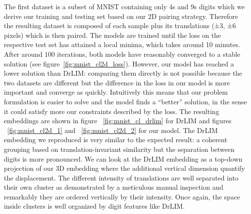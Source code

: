 \documentclass[a4paper,12pt]{report}
\begin{document}
The first dataset is a subset of MNIST containing only 4s and 9s digits which we derive our training and testing set based on our 2D pairing strategy.
Therefore the resulting dataset is composed of each sample plus its translations (±3, ±6 pixels) which is then paired.
The models are trained until the loss on the respective test set has attained a local minima, which takes around 10 minutes.
After around $100$ iterations, both models have reasonably converged to a stable solution (see figure~\ref{fig:mnist_cl2d_loss}).
However, our model has reached a lower solution than DrLIM: comparing them directly is not possible because the two datasets are different but the difference in the loss in our model is more important and converge as quickly.
Intuitively this means that our problem formulation is easier to solve and the model finds a ``better'' solution, in the sense it could satisfy more our constraints described by the loss.
The resulting embeddings are shown in figure ~\ref{fig:mnist_cl_drlim} for DrLIM and figures ~\ref{fig:mnist_cl2d_1} and ~\ref{fig:mnist_cl2d_2} for our model.
The DrLIM embedding we reproduced is very similar to the expected result: a coherent grouping based on translation-invariant similarity but the separation between digits is more pronounced.
We can look at the DrLIM embedding as a top-down projection of our 3D embedding where the additional vertical dimension quantify the displacement.
The different intensity of translations are well separated into their own cluster as demonstrated by a meticulous manual inspection and remarkably they are ordered vertically by their intensity.
Once again, the space inside clusters is well organized by digit features like DrLIM.
\end{document}

